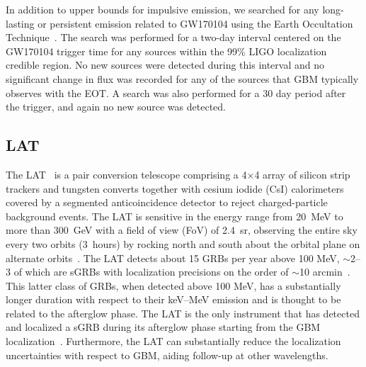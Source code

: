 \documentclass{aastex61}
\begin{document}
In addition to upper bounds for impulsive emission, we searched for any long-lasting or persistent emission related to GW170104 using the Earth Occultation Technique~\citep[EOT;][]{Wilson-Hodge12}.  The search was performed for a two-day interval centered on the GW170104 trigger time for any sources within the 99\% LIGO localization credible region. No new sources were detected during this interval and no significant change in flux was recorded for any of the sources that GBM typically observes with the EOT.  A search was also performed for a 30 day period after the trigger, and again no new source was detected.

\subsection{LAT}
The LAT~\citep{Atwood09} is a pair conversion telescope comprising a 4$\times$4 array of silicon strip trackers and tungsten converts together with cesium iodide (CsI) calorimeters covered by a  segmented  anticoincidence  detector  to  reject charged-particle  background  events. The  LAT is sensitive in the  energy range from 20~MeV  to  more than 300~GeV with a field of view (FoV) of 2.4~sr, observing the  entire  sky  every  two  orbits  (3~hours)  by rocking north and south about the orbital plane on alternate orbits~\citep{Atwood09}. The LAT detects about 15 GRBs per year above 100 MeV, $\sim$2--3 of which are sGRBs with localization precisions on the order of $\sim$10 arcmin~\citep{Vianello15}. This latter class of GRBs, when detected above 100 MeV,  has a substantially longer duration with respect to their keV--MeV emission and is thought to be related to the afterglow phase. The LAT is the only instrument that has detected and localized a sGRB during its afterglow phase starting from the GBM localization~\citep{Ackermann10}. Furthermore, the LAT can substantially reduce the localization uncertainties with respect to GBM, aiding follow-up at other wavelengths.
\end{document}
